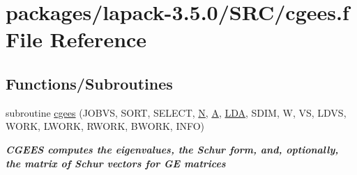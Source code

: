\hypertarget{cgees_8f}{}\section{packages/lapack-\/3.5.0/\+S\+R\+C/cgees.f File Reference}
\label{cgees_8f}
\subsection*{Functions/\+Subroutines}
\begin{DoxyCompactItemize}
\item 
subroutine \hyperlink{group__complexGEeigen_ga6116f4ac8725e779da5d28d3f858ad2f}{cgees} (J\+O\+B\+V\+S, S\+O\+R\+T, S\+E\+L\+E\+C\+T, \hyperlink{polmisc_8c_a0240ac851181b84ac374872dc5434ee4}{N}, \hyperlink{classA}{A}, \hyperlink{example__user_8c_ae946da542ce0db94dced19b2ecefd1aa}{L\+D\+A}, S\+D\+I\+M, W, V\+S, L\+D\+V\+S, W\+O\+R\+K, L\+W\+O\+R\+K, R\+W\+O\+R\+K, B\+W\+O\+R\+K, I\+N\+F\+O)
\begin{DoxyCompactList}\small\item\em {\bfseries  C\+G\+E\+E\+S computes the eigenvalues, the Schur form, and, optionally, the matrix of Schur vectors for G\+E matrices} \end{DoxyCompactList}\end{DoxyCompactItemize}
